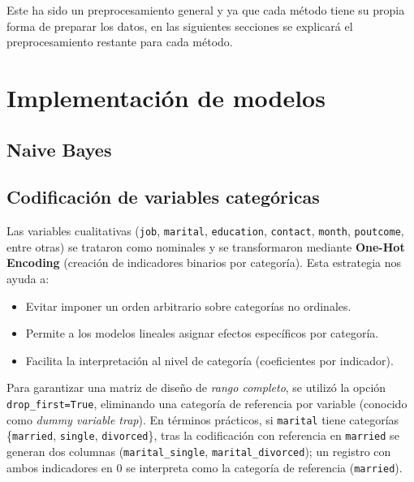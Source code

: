 \documentclass[10pt]{article}
\begin{document}
Este ha sido un preprocesamiento general y ya que cada método tiene su propia forma de preparar los datos, en las siguientes secciones se explicará el preprocesamiento restante para cada método.






\section{Implementación de modelos}

\subsection{Naive Bayes}











\newpage
\subsection*{Codificación de variables categóricas}
Las variables cualitativas (\texttt{job}, \texttt{marital}, \texttt{education}, \texttt{contact}, \texttt{month}, \texttt{poutcome}, entre otras) se trataron como nominales y se transformaron mediante \textbf{One-Hot Encoding} (creación de indicadores binarios por categoría). Esta estrategia nos ayuda a:  
\begin{itemize}
    \item Evitar imponer un orden arbitrario sobre categorías no ordinales.
    \item Permite a los modelos lineales asignar efectos específicos por categoría.
    \item Facilita la interpretación al nivel de categoría (coeficientes por indicador).
\end{itemize}

Para garantizar una matriz de diseño de \emph{rango completo}, se utilizó la opción \texttt{drop\_first=True}, eliminando una categoría de referencia por variable (conocido como \emph{dummy variable trap}). En términos prácticos, si \texttt{marital} tiene categorías \{\texttt{married}, \texttt{single}, \texttt{divorced}\}, tras la codificación con referencia en \texttt{married} se generan dos columnas (\texttt{marital\_single}, \texttt{marital\_divorced}); un registro con ambos indicadores en \(0\) se interpreta como la categoría de referencia (\texttt{married}). 
\end{document}
